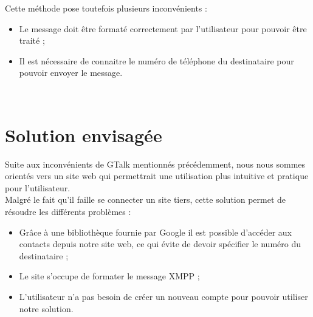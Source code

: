 Cette méthode pose toutefois plusieurs inconvénients :
\begin{itemize}
	\item Le message doit être formaté correctement par l'utilisateur pour pouvoir être traité ;
	\item Il est nécessaire de connaitre le numéro de téléphone du destinataire pour pouvoir envoyer le message.
\end{itemize}
~~\\






\section{Solution envisagée}

Suite aux inconvénients de GTalk mentionnés précédemment, nous nous sommes orientés vers un site web qui permettrait une utilisation plus intuitive et pratique pour l'utilisateur.
\\

Malgré le fait qu'il faille se connecter un site tiers, cette solution permet de résoudre les différents problèmes :
\begin{itemize}
	\item Grâce à une bibliothèque fournie par Google il est possible d'accéder aux contacts depuis notre site web, ce qui évite de devoir spécifier le numéro du destinataire ;
	\item Le site s'occupe de formater le message XMPP ;
	\item L'utilisateur n'a pas besoin de créer un nouveau compte pour pouvoir utiliser notre solution.
\end{itemize}
~~\\
